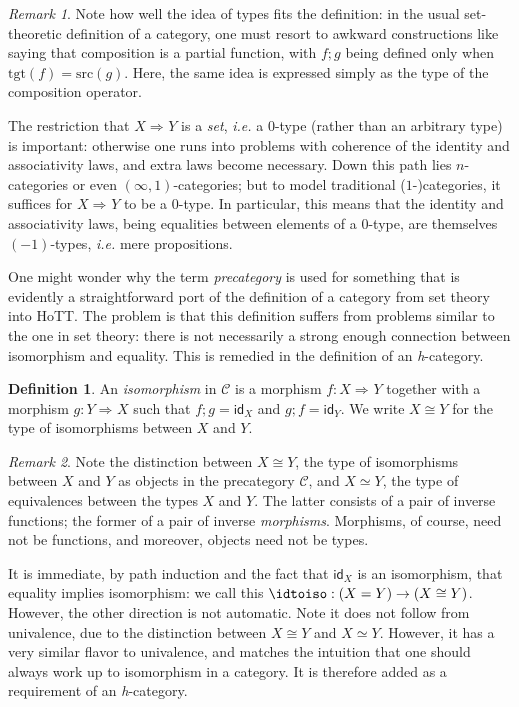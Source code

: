 \documentclass[preprint,authoryear]{sigplanconf}
\newcommand{\ie}{\latin{i.e.}\xspace}
\newcommand{\term}[1]{\emph{#1}}
\newcommand{\latin}[1]{\textit{#1}}
\newcommand{\mcal}[1]{\ensuremath{\mathcal{#1}}}
\newcommand{\msf}[1]{\ensuremath{\mathsf{#1}}\xspace}
\renewcommand{\equiv}{\simeq}         %
\newcommand{\iso}{\cong}              %
\theoremstyle{definition}
\newtheorem{defn}[thm]{Definition}
\theoremstyle{remark}
\newtheorem*{rem}{Remark}
\newcommand{\hott}[1]{\textit{h}-#1}
\newcommand{\homsymb}{\Rightarrow}
\providecommand{\hom}{}
\renewcommand{\hom}[3][]{#2 \homsymb_{#1} #3}
\newcommand{\CT}{\mcal{C}}
\newcommand{\idT}{\msf{id}}
\newcommand{\then}{\mathbin{;}}                       %
\begin{document}
\begin{rem}
  Note how well the idea of types fits the definition: in the usual
  set-theoretic definition of a category, one must resort to awkward
  constructions like saying that composition is a partial function,
  with $f \then g$ being defined only when $\mathrm{tgt}(f) =
  \mathrm{src}(g)$.  Here, the same idea is expressed simply as the
  type of the composition operator.

  The restriction that $\hom X Y$ is a \emph{set}, \ie a $0$-type
  (rather than an arbitrary type) is important: otherwise one runs
  into problems with coherence of the identity and associativity laws,
  and extra laws become necessary.  Down this path lies $n$-categories
  or even $(\infty,1)$-categories; but to model traditional
  ($1$-)categories, it suffices for $\hom X Y$ to be a $0$-type.  In
  particular, this means that the identity and associativity laws,
  being equalities between elements of a $0$-type, are themselves
  $(-1)$-types, \ie mere propositions.
\end{rem}

One might wonder why the term \term{precategory} is used for something
that is evidently a straightforward port of the definition of a
category from set theory into HoTT.  The problem is that this
definition suffers from problems similar to the one in set theory:
there is not necessarily a strong enough connection between
isomorphism and equality.  This is remedied in the definition of an
\hott{category}.

\begin{defn}
  An \term{isomorphism} in $\CT$ is a morphism $f : \hom X Y$
  together with a morphism $g : \hom Y X$ such that $f \then g =
  \idT_X$ and $g \then f = \idT_Y$.  We write $X \iso Y$ for the type
  of isomorphisms between $X$ and $Y$.
\end{defn}

\begin{rem}
  Note the distinction between $X \iso Y$, the type of isomorphisms
  between $X$ and $Y$ as objects in the precategory $\CT$, and $X \equiv
  Y$, the type of equivalences between the types $X$ and $Y$.  The
  latter consists of a pair of inverse functions; the former of a pair
  of inverse \emph{morphisms}.  Morphisms, of course, need not be
  functions, and moreover, objects need not be types.
\end{rem}

It is immediate, by path induction and the fact that $\idT_X$ is an
isomorphism, that equality implies isomorphism: we call this $\idtoiso
: (X = Y) \to (X \iso Y)$.  However, the other direction is not
automatic.  Note it does not follow from univalence, due to the
distinction between $X \iso Y$ and $X \equiv Y$. However, it has a very
similar flavor to univalence, and matches the intuition that one
should always work up to isomorphism in a category.  It is therefore
added as a requirement of an \hott{category}.
\end{document}
